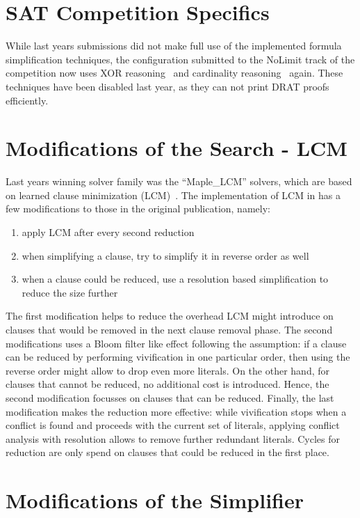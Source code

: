 \documentclass[conference]{IEEEtran}
\begin{document}
\section{SAT Competition Specifics}

While last years submissions did not make full use of the implemented formula simplification techniques, the configuration submitted to the NoLimit track of the competition now uses XOR reasoning~\cite{SoosNC:2009} and cardinality reasoning~\cite{Mlazycard} again.
These techniques have been disabled last year, as they can not print DRAT proofs efficiently.

\section{Modifications of the Search - LCM}

Last years winning solver family was the ``Maple\_LCM'' solvers, which are based on learned clause minimization (LCM)~\cite{lcm-ijcai2017}.
The implementation of LCM in \riss has a few modifications to those in the original publication, namely:
% 
\begin{enumerate}
 \item apply LCM after every second reduction
 \item when simplifying a clause, try to simplify it in reverse order as well
 \item when a clause could be reduced, use a resolution based simplification to reduce the size further
\end{enumerate}
% 
The first modification helps to reduce the overhead LCM might introduce on clauses that would be removed in the next clause removal phase.
The second modifications uses a Bloom filter like effect following the assumption: if a clause can be reduced by performing vivification in one particular order, then using the reverse order might allow to drop even more literals.
On the other hand, for clauses that cannot be reduced, no additional cost is introduced.
Hence, the second modification focusses on clauses that can be reduced.
Finally, the last modification makes the reduction more effective: while vivification stops when a conflict is found and proceeds with the current set of literals, applying conflict analysis with resolution allows to remove further redundant literals.
Cycles for reduction are only spend on clauses that could be reduced in the first place.


\section{Modifications of the Simplifier}
\end{document}
